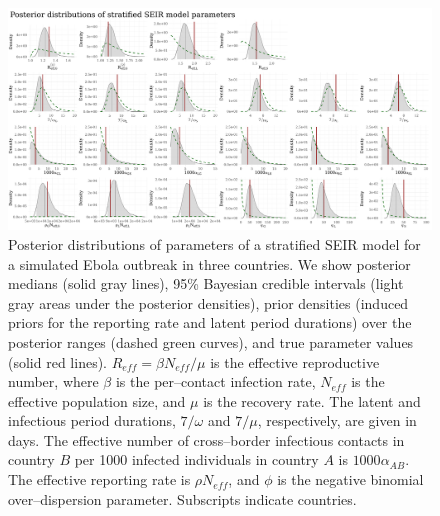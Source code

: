 \begin{figure}
	\begin{fullpage}
		\centering
		\includegraphics[width=\linewidth]{figures/ebola_synth_posts}
		\caption[Posterior distributions of stratified SEIR model parameters for a simulated Ebola outbreak in three countries.]{Posterior distributions of parameters of a stratified SEIR model for a simulated Ebola outbreak in three countries. We show posterior medians (solid gray lines), 95\% Bayesian credible intervals (light gray areas under the posterior densities), prior densities (induced priors for the reporting rate and latent period durations) over the posterior ranges (dashed green curves), and true parameter values (solid red lines). $ R_{eff} = \beta N_{eff}/\mu $ is the effective reproductive number, where $ \beta $ is the per--contact infection rate, $ N_{eff} $ is the effective population size, and $ \mu $ is the recovery rate. The latent and infectious period durations, $ 7/\omega $ and $ 7/\mu $, respectively, are given in days. The effective number of cross--border infectious contacts in country $ B $ per 1000 infected individuals in country $ A $ is $ 1000\alpha_{AB} $. The effective reporting rate is $ \rho N_{eff} $, and $ \phi $ is the negative binomial over--dispersion parameter. Subscripts indicate countries.}
		\label{fig:ebola_synth_posts}
	\end{fullpage}
\end{figure}

